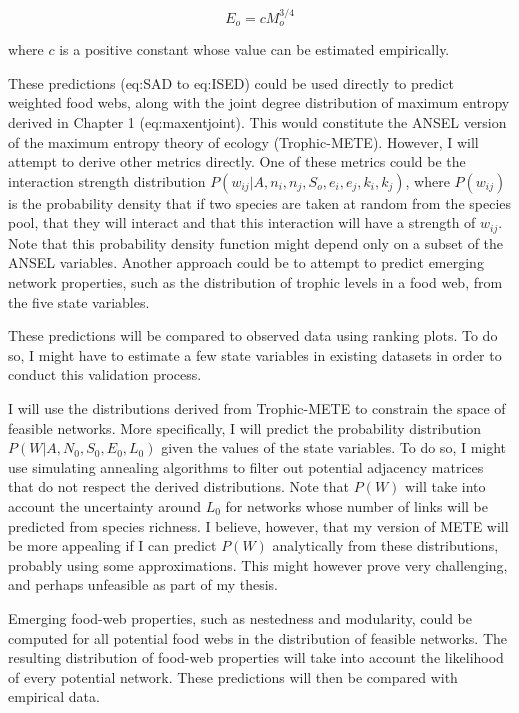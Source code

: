 $$E_o = cM_o^{3/4}$$

where $c$ is a positive constant whose value can be estimated empirically.

These predictions (eq:SAD to eq:ISED) could be used directly to predict
weighted food webs, along with the joint degree distribution of maximum entropy
derived in Chapter 1 (eq:maxentjoint). This would constitute the ANSEL version
of the maximum entropy theory of ecology (Trophic-METE). However, I will attempt
to derive other metrics directly. One of these metrics could be the interaction
strength distribution $P(w_{ij}|A, n_i, n_j, S_o, e_i, e_j, k_i, k_j)$, where
$P(w_{ij})$ is the probability density that if two species are taken at random
from the species pool, that they will interact and that this interaction will
have a strength of $w_{ij}$. Note that this probability density function might
depend only on a subset of the ANSEL variables. Another approach could be to
attempt to predict emerging network properties, such as the distribution of
trophic levels in a food web, from the five state variables.

These predictions will be compared to observed data using ranking plots. To do
so, I might have to estimate a few state variables in existing datasets in order
to conduct this validation process.

I will use the distributions derived from Trophic-METE to constrain the space of
feasible networks. More specifically, I will predict the probability
distribution $P(W|A, N_0, S_0, E_0, L_0)$ given the values of the state
variables. To do so, I might use simulating annealing algorithms to filter out
potential adjacency matrices that do not respect the derived distributions. Note
that $P(W)$ will take into account the uncertainty around $L_0$ for networks
whose number of links will be predicted from species richness. I believe,
however, that my version of METE will be more appealing if I can predict $P(W)$
analytically from these distributions, probably using some approximations. This
might however prove very challenging, and perhaps unfeasible as part of my
thesis.

Emerging food-web properties, such as nestedness and modularity, could be
computed for all potential food webs in the distribution of feasible networks.
The resulting distribution of food-web properties will take into account the
likelihood of every potential network. These predictions will then be compared
with empirical data.


